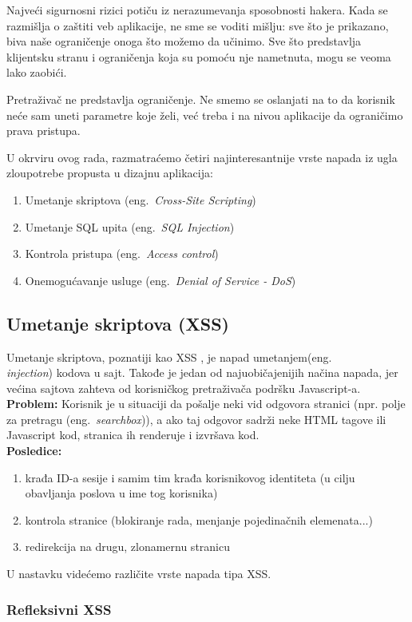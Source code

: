 \documentclass[a4paper]{article}
\begin{document}
Najveći sigurnosni rizici potiču iz nerazumevanja sposobnosti hakera. Kada se razmišlja o zaštiti veb aplikacije, ne sme se voditi mišlju: sve što je prikazano, biva naše ograničenje onoga što možemo da učinimo. Sve što predstavlja klijentsku stranu i ograničenja koja su pomoću nje nametnuta, mogu se veoma lako zaobići.

Pretraživač ne predstavlja ograničenje. Ne smemo se oslanjati na to da korisnik neće sam uneti parametre koje želi, već treba i na nivou aplikacije da ograničimo prava pristupa.

U okrviru ovog rada, razmatraćemo četiri najinteresantnije vrste napada iz ugla zloupotrebe propusta u dizajnu aplikacija:
\begin{enumerate}
	\item Umetanje skriptova (eng.~{\em Cross-Site Scripting})
	\item Umetanje SQL upita (eng.~{\em SQL Injection})
	\item Kontrola pristupa (eng.~{\em Access control})
	\item Onemogućavanje usluge (eng.~{\em Denial of Service - DoS})
\end{enumerate}
\subsection{Umetanje skriptova (XSS)}
Umetanje skriptova, poznatiji kao XSS \cite{XSS}, je napad umetanjem(eng.~{\em \\injection}) kodova u sajt. Takođe je jedan od najuobičajenijih načina napada, jer većina sajtova zahteva od korisničkog pretraživača podršku Javascript-a.\\
\textbf{Problem:} Korisnik je u situaciji da pošalje neki vid odgovora stranici (npr. polje za pretragu (eng.~{\em searchbox})), a ako taj odgovor sadrži neke HTML tagove ili Javascript kod, stranica ih renderuje i izvršava kod.\\
\textbf{Posledice:}
\begin{enumerate}
	\item krađa ID-a sesije i samim tim krađa korisnikovog identiteta (u cilju obavljanja poslova u ime tog korisnika)
	\item kontrola stranice (blokiranje rada, menjanje pojedinačnih elemenata...)
	\item redirekcija na drugu, zlonamernu stranicu
\end{enumerate}
U nastavku videćemo različite vrste napada tipa XSS.

\subsubsection{Refleksivni XSS}
\end{document}
